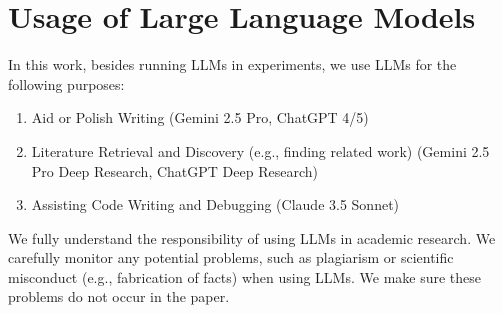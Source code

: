\section*{Usage of Large Language Models}
In this work, besides running LLMs in experiments, we use LLMs for the following purposes:
\begin{enumerate}
    \item Aid or Polish Writing (Gemini 2.5 Pro, ChatGPT 4/5)
    \item Literature Retrieval and Discovery (e.g., finding related work) (Gemini 2.5 Pro Deep Research, ChatGPT Deep Research)
    \item Assisting Code Writing and Debugging (Claude 3.5 Sonnet)
\end{enumerate}
We fully understand the responsibility of using LLMs in academic research. We carefully monitor any potential problems, such as plagiarism or scientific misconduct (e.g., fabrication of facts) when using LLMs. We make sure these problems do not occur in the paper. 